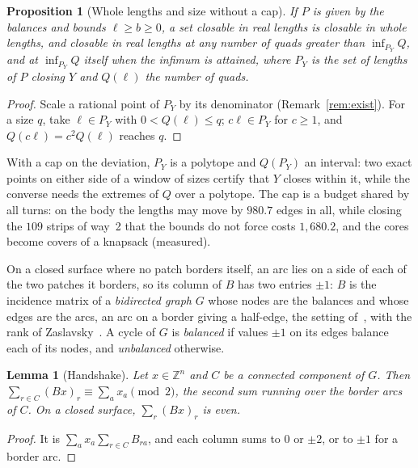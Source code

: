 \documentclass[11pt,a4paper]{article}
\newtheorem{proposition}{Proposition}
\newtheorem{lemma}{Lemma}
\newcommand{\Z}{\mathbb{Z}}
\begin{document}
\begin{proposition}[Whole lengths and size without a cap]\label{prop:whole-size}
If $P$ is given by the balances and bounds $\ell \ge b \ge 0$, a set closable
in real lengths is closable in whole lengths, and closable in real lengths at
any number of quads greater than $\inf_{P_Y} Q$, and at $\inf_{P_Y} Q$ itself
when the infimum is attained, where $P_Y$ is the set of lengths of $P$ closing
$Y$ and $Q(\ell)$ the number of quads.
\end{proposition}

\begin{proof}
Scale a rational point of $P_Y$ by its denominator (Remark~\ref{rem:exist}).
For a size $q$, take $\ell \in P_Y$ with $0 < Q(\ell) \le q$; $c\ell \in P_Y$
for $c \ge 1$, and $Q(c\ell) = c^2 Q(\ell)$ reaches $q$.
\end{proof}

With a cap on the deviation, $P_Y$ is a polytope and $Q(P_Y)$ an interval: two
exact points on either side of a window of sizes certify that $Y$ closes
within it, while the converse needs the extremes of $Q$ over a polytope. The
cap is a budget shared by all turns: on the body the lengths may move by
$980.7$ edges in all, while closing the $109$ strips of way~2 that the bounds
do not force costs $1{,}680.2$, and the cores become covers of a knapsack
(measured).

On a closed surface where no patch borders itself, an arc lies on a side of
each of the two patches it borders, so its column of $B$ has two entries
$\pm1$: $B$ is the incidence matrix of a \emph{bidirected graph} $G$ whose
nodes are the balances and whose edges are the arcs, an arc on a border giving
a half-edge, the setting of~\cite{heistermann2023bimdf}, with the rank of
Zaslavsky~\cite{zaslavsky1982signed}.
A cycle of $G$ is \emph{balanced} if values $\pm1$ on its edges balance each
of its nodes, and \emph{unbalanced} otherwise.

\begin{lemma}[Handshake]\label{lem:handshake}
Let $x \in \Z^n$ and $C$ be a connected component of $G$. Then $\sum_{r \in C}
(Bx)_r \equiv \sum_{a} x_a \pmod 2$, the second sum running over the border
arcs of $C$. On a closed surface, $\sum_r (Bx)_r$ is even.
\end{lemma}

\begin{proof}
It is $\sum_a x_a \sum_{r \in C} B_{ra}$, and each column sums to $0$ or
$\pm2$, or to $\pm1$ for a border arc.
\end{proof}
\end{document}
